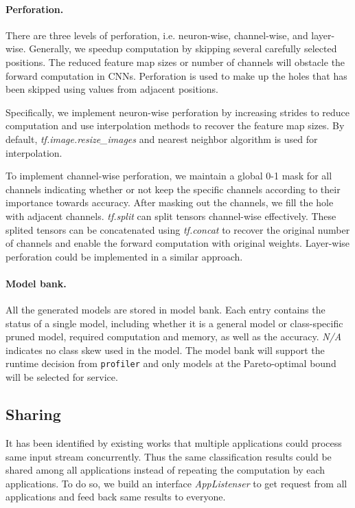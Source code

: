 \documentclass[pageno]{jpaper}
\begin{document}
\paragraph{Perforation.}
There are three levels of perforation, i.e. neuron-wise, channel-wise, and layer-wise. Generally, we speedup computation by skipping several carefully selected positions. The reduced feature map sizes or number of channels will obstacle the forward computation in CNNs. Perforation is used to make up the holes that has been skipped using values from adjacent positions. 

Specifically, we implement neuron-wise perforation by increasing strides to reduce computation and use interpolation methods to recover the feature map sizes. By default, \textit{tf.image.resize\_images} and nearest neighbor algorithm is used for interpolation. 

To implement channel-wise perforation, we maintain a global 0-1 mask for all channels indicating whether or not keep the specific channels according to their importance towards accuracy. After masking out the channels, we fill the hole with adjacent channels. \textit{tf.split} can split tensors channel-wise effectively. These splited tensors can be concatenated using \textit{tf.concat} to recover the original number of channels and enable the forward computation with original weights. Layer-wise perforation could be implemented in a similar approach.




\paragraph{Model bank.}
All the generated models are stored in model bank. Each entry contains the status of a single model, including whether it is a general model or class-specific pruned model, required computation and memory, as well as the accuracy. \textit{N/A} indicates no class skew used in the model. The model bank will support the runtime decision from \texttt{profiler} and only models at the Pareto-optimal bound will be selected for service.



\subsection{Sharing}
It has been identified by existing works \cite{guo2018potluck, jiang2018mainstream} that multiple applications could process same input stream concurrently. Thus the same classification results could be shared among all applications instead of repeating the computation by each applications. To do so, we build an interface \textit{AppListenser} to get request from all applications and feed back same results to everyone. 
\end{document}
